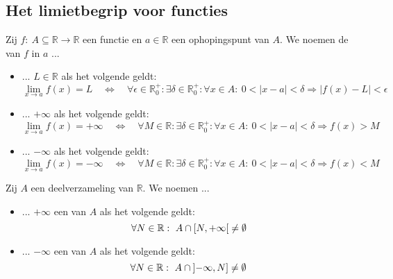 \documentclass[main.tex]{subfiles}
\begin{document}
\subsection{Het limietbegrip voor functies}

\begin{de}
  Zij $f:\ A \subseteq \mathbb{R} \rightarrow \mathbb{R}$ een functie en $a\in \mathbb{R}$ een ophopingspunt van $A$.
  We noemen de  van $f$ in $a$ ...
  \begin{itemize}
  \item ... $L\in \mathbb{R}$ als het volgende geldt:
    \[
    \lim_{x\rightarrow a}f(x) = L \quad\Leftrightarrow\quad
    \forall \epsilon \in \mathbb{R}_{0}^{+}: \exists \delta \in \mathbb{R}_{0}^{+}: \forall x\in A:\ 0 < |x-a| < \delta \Rightarrow |f(x) - L| < \epsilon
    \]
  \item ... $+\infty$ als het volgende geldt:
    \[
    \lim_{x\rightarrow a}f(x) = +\infty\quad\Leftrightarrow\quad
    \forall M \in \mathbb{R}: \exists \delta \in \mathbb{R}_{0}^{+}: \forall x\in A:\ 0 < |x-a| < \delta \Rightarrow f(x) > M
    \]
  \item ... $-\infty$ als het volgende geldt:
    \[
    \lim_{x\rightarrow a}f(x) = -\infty\quad\Leftrightarrow\quad
    \forall M \in \mathbb{R}: \exists \delta \in \mathbb{R}_{0}^{+}: \forall x\in A:\ 0 < |x-a| < \delta \Rightarrow f(x) < M
    \]
  \end{itemize}
\end{de}

\begin{de}
  Zij $A$ een deelverzameling van $\mathbb{R}$.
  We noemen ...
  \begin{itemize}
  \item ... $+\infty$ een  van $A$ als het volgende geldt:
    \[ \forall N \in \mathbb{R}:\ A \cap \interval[open right]{N}{+\infty} \neq \emptyset \]
  \item ... $-\infty$ een  van $A$ als het volgende geldt:
    \[ \forall N \in \mathbb{R}:\ A \cap \interval[open left]{-\infty}{N} \neq \emptyset \]
  \end{itemize}
\end{de}
\end{document}
